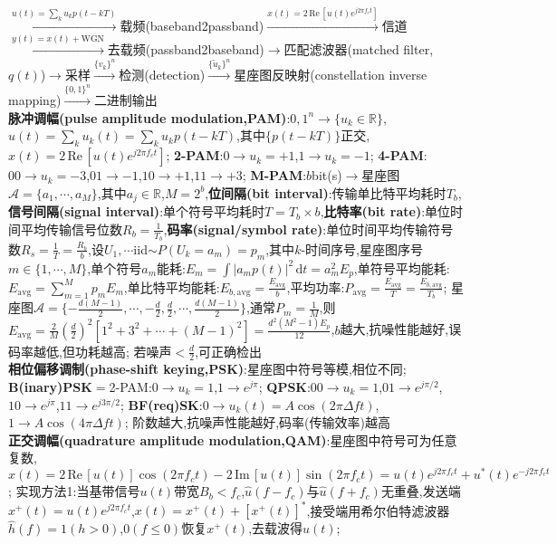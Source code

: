 \documentclass[UTF8,a4paper,10pt]{article}
\providecommand{\abs}[1]{\left\lvert#1\right\rvert}
\providecommand{\re}{\,\mathrm{Re}\,}
\providecommand{\im}{\,\mathrm{Im}\,}
\begin{document}
\begin{multicols*}{2}
    $\overset{u(t)=\sum_ku_kp(t-kT)}{\rightarrow}$载频(baseband2passband)$\overset{x(t)=2\re[u(t)e^{j2\pi f_ct}]}{\rightarrow}$信道$\overset{y(t)=x(t)+\text{WGN}}{\rightarrow}$去载频(passband2baseband)$\rightarrow$匹配滤波器(matched filter,$q(t)$)$\rightarrow$采样$\overset{\{v_k\}^n}{\rightarrow}$检测(detection)$\overset{\{\tilde{u}_k\}^n}{\rightarrow}$星座图反映射(constellation inverse mapping)$\overset{\{0,1\}^n}{\rightarrow}$二进制输出\\
\textbf{脉冲调幅(pulse amplitude modulation,PAM)}:${0,1}^n\rightarrow\{u_k\in\mathbb{R}\}$,$u(t)=\sum_ku_k(t)=\sum_ku_kp(t-kT)$,其中$\{p(t-kT)\}$正交,$x(t)=2\re[u(t)e^{j2\pi f_ct}]$;%
    \textbf{2-PAM}:$0\rightarrow u_k=+1$,$1\rightarrow u_k=-1$;%
    \textbf{4-PAM}:$00\rightarrow u_k=-3$,$01\rightarrow-1$,$10\rightarrow+1$,$11\rightarrow+3$;%
    \textbf{M-PAM}:$b$bit(s)$\rightarrow$星座图$\mathcal{A}=\{a_1,\cdots,a_M\}$,其中$a_j\in\mathbb{R}$,$M=2^b$,\textbf{位间隔(bit interval)}:传输单比特平均耗时$T_b$,\textbf{信号间隔(signal interval)}:单个符号平均耗时$T=T_b\times b$,\textbf{比特率(bit rate)}:单位时间平均传输信号位数$R_b=\frac{1}{T_b}$,\textbf{码率(signal/symbol rate)}:单位时间平均传输符号数$R_s=\frac{1}{T}=\frac{R_b}{b}$,设$U_1,\cdots$iid$\sim P(U_k=a_m)=p_m$,其中$k$-时间序号,星座图序号$m\in\{1,\cdots,M\}$,单个符号$a_m$能耗:$E_m=\int\abs{a_mp(t)}^2\,\mathrm{d}t=a_m^2E_p$,单符号平均能耗:$E_{\text{avg}}=\sum_{m=1}^Mp_mE_m$,单比特平均能耗:$E_{b,\text{avg}}=\frac{E_{\text{avg}}}{b}$,平均功率:$P_{\text{avg}}=\frac{E_{\text{avg}}}{T}=\frac{E_{b,\text{avg}}}{T_b}$;%
    星座图$\mathcal{A}=\{-\frac{d(M-1)}{2},\cdots,-\frac{d}{2},\frac{d}{2},\cdots,\frac{d(M-1)}{2}\}$,通常$P_m=\frac{1}{M}$,则$E_{\text{avg}}=\frac{2}{M}(\frac{d}{2})^2[1^2+3^2+\cdots+(M-1)^2]=\frac{d^2(M^2-1)E_p}{12}$,$b$越大,抗噪性能越好,误码率越低,但功耗越高;%
    若噪声$<\frac{d}{2}$,可正确检出\\
\textbf{相位偏移调制(phase-shift keying,PSK)}:星座图中符号等模,相位不同;%
    \textbf{B(inary)PSK}$=$2-PAM:$0\rightarrow u_k=1$,$1\rightarrow e^{j\pi}$;%
    \textbf{QPSK}:$00\rightarrow u_k=1$,$01\rightarrow e^{j\pi/2}$,$10\rightarrow e^{j\pi}$,$11\rightarrow e^{j3\pi/2}$;%
    \textbf{BF(req)SK}:$0\rightarrow u_k(t)=A\cos(2\pi\Delta ft)$,$1\rightarrow A\cos(4\pi\Delta ft)$;%
    阶数越大,抗噪声性能越好,码率(传输效率)越高\\
\textbf{正交调幅(quadrature amplitude modulation,QAM)}:星座图中符号可为任意复数,$x(t)=2\re[u(t)]\cos(2\pi f_ct)-2\im[u(t)]\sin(2\pi f_ct)=u(t)e^{j2\pi f_ct}+u^*(t)e^{-j2\pi f_ct}$;%
    实现方法1:当基带信号$u(t)$带宽$B_b<f_c$,$\hat{u}(f-f_c)$与$\hat{u}(f+f_c)$无重叠,发送端$x^+(t)=u(t)e^{j2\pi f_ct}$,$x(t)=x^+(t)+[x^+(t)]^*$,接受端用希尔伯特滤波器$\hat{h}(f)=1(h>0)$,$0(f\leq 0)$恢复$x^+(t)$,去载波得$u(t)$;%

\end{multicols*}
\end{document}
